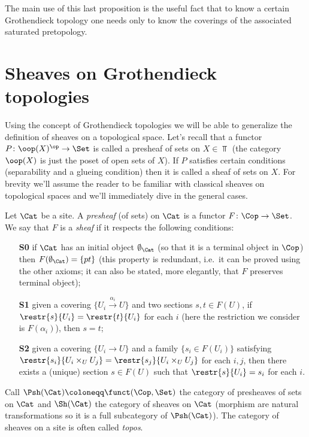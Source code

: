 \documentclass[a4paper]{article}
\begin{document}
            The main use of this last proposition is the useful fact that to know a certain Grothendieck topology one needs only to know the coverings of the associated saturated pretopology.
    \section{Sheaves on Grothendieck topologies}
        Using the concept of Grothendieck topologies we will be able to generalize the definition of sheaves on a topological space. Let's recall that a functor $P\colon \oop(X)^{\op} \to \Set$ is called a presheaf of sets on $X \in \Top$ (the category $\oop(X)$ is just the poset of open sets of $X$). If $P$ satisfies certain conditions (separability and a glueing condition) then it is called a sheaf of sets on $X$. For brevity we'll assume the reader to be familiar with classical sheaves on topological spaces and we'll immediately dive in the general cases.

        \begin{defn}
            Let $\Cat$ be a site. A \emph{presheaf} (of sets) on $\Cat$ is a functor $F\colon \Cop \to \Set$. We say that $F$ is a \emph{sheaf} if it respects the following conditions:
            \begin{enumerate}
                \item[\textbf{S0}] if $\Cat$ has an initial object $\emptyset_{\Cat}$ (so that it is a terminal object in $\Cop$) then $F(\emptyset_{\Cat}) = \{pt\}$ (this property is redundant, i.e.\ it can be proved using the other axioms; it can also be stated, more elegantly, that $F$ preserves terminal object);
                \item[\textbf{S1}] given a covering $\{U_i \stackrel{\alpha_i}{\to} U\}$ and two sections $s, t \in F(U)$, if $\restr{s}{U_i} = \restr{t}{U_i}$ for each $i$ (here the restriction we consider is $F(\alpha_i)$), then $s = t$;
                \item[\textbf{S2}] given a covering $\{U_i \to U\}$ and a family $\{s_i \in F(U_i)\}$ satisfying $\restr{s_i}{U_i \times_U U_j} = \restr{s_j}{U_i \times_U U_j}$ for each $i, j$, then there exists a (unique) section $s \in F(U)$ such that $\restr{s}{U_i} = s_i$ for each $i$.
            \end{enumerate}
        \end{defn}

        \begin{defn}
            Call $\Psh(\Cat) \coloneqq \funct(\Cop, \Set)$ the category of presheaves of sets on $\Cat$ and $\Sh(\Cat)$ the category of sheaves on $\Cat$ (morphism are natural transformations so it is a full subcategory of $\Psh(\Cat)$). The category of sheaves on a site is often called \emph{topos}.
        \end{defn}
\end{document}
